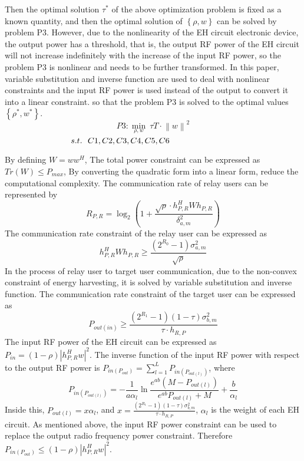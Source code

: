 \documentclass[conference]{IEEEtran}
\begin{document}
Then the optimal solution $\tau ^{\ast }$ of the above optimization problem is fixed as a known quantity, and then the optimal solution of $\left \{ \rho ,w \right \}$ can be solved by problem P3. However, due to the nonlinearity of the EH circuit electronic device, the output power has a threshold, that is, the output RF power of the EH circuit will not increase indefinitely with the increase of the input RF power, so the problem P3 is nonlinear and needs to be further transformed. 
In this paper, variable substitution and inverse function are used to deal with nonlinear constraints and the input RF power is used instead of the output to convert it into a linear constraint. so that the problem P3 is solved to the optimal values $\left \{ \rho^{\ast } ,w^{\ast } \right \}$.
$$P3:\underset{\rho,w}{\min} \ \tau T\cdot \left \| w \right \|^{2}$$
$\qquad \qquad \qquad \qquad   s.t.\ \ \notag{C1}, \notag{C2}, \notag{C3}, \notag{C4}, \notag{C5}, \notag{C6}$

By defining $W= ww^{H}$, The total power constraint can be expressed as $Tr\left ( W \right )\le P_{max}$, By converting the quadratic form into a linear form, reduce the computational complexity. The communication rate of relay users can be represented by 
\begin{equation}\label{eqn-1}
R_{P,R} = \log_{2}\left ( 1+\frac{\sqrt{\rho }\cdot h_{P,R}^{H}Wh_{P,R}     }{\delta _{a,m}^{2} }  \right )
\end{equation} 
The communication rate constraint of the relay user can be expressed as 
\begin{equation}\label{eqn-1}
h_{P,R}^{H}Wh_{P,R} \ge \frac{\left ( 2^{R_{0} }-1  \right )\sigma _{a,m}^{2}  }{\sqrt{\rho } }
\end{equation} 
In the process of relay user to target user communication, due to the non-convex constraint of energy harvesting, it is solved by variable substitution and inverse function. The communication rate constraint of the target user can be expressed as
\begin{equation}\label{eqn-1}
P_{out(in)} \ge \frac{\left ( 2^{R_{1} }-1  \right )\left ( 1-\tau  \right ) \sigma _{b,m}^{2}  }{\tau \cdot h_{R,P} }
\end{equation}  
The input RF power of the EH circuit can be expressed as $P_{in} =  \left ( 1-\rho  \right )\left | h_{P,R}^{H}w  \right | ^{2} $. The inverse function of the input RF power with respect to the output RF power is $P_{in(P_{out} )} = {\textstyle \sum_{l=1}^{L}} P_{in(P_{out(l)} )}$, where 
\begin{equation}\label{eqn-1}
P_{in(P_{out(l)} )} =-\frac{1}{a\alpha _{l} }\ln \frac{e^{ab}(M-P_{out(l)}) }{e^{ab}P_{out(l)}+M} +\frac{b}{\alpha _{l} }
\end{equation}  
Inside this, $P_{out(l)}=x \alpha _{l}$, and $x=\frac{\left ( 2^{R_{1} }-1  \right )\left ( 1-\tau  \right ) \sigma _{b,m}^{2}  }{\tau \cdot h_{R,P} } $, $\alpha _{l}$ is the weight of each EH circuit. As mentioned above, the input RF power constraint can be used to replace the output radio frequency power constraint. Therefore $P_{in(P_{out} )} \le \left ( 1-\rho  \right )\left | h_{P,R}^{H}w  \right |^{2}$.
\end{document}

